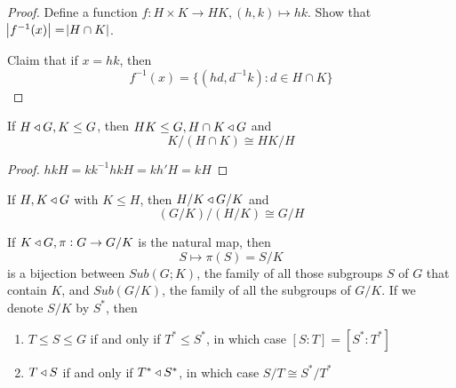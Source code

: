 \documentclass[11pt]{article}
\begin{document}
\begin{proof}
Define a function \(f:H\times K\to HK,(h,k)\mapsto hk\). Show that
\(\abs{f^{-1}(x)}=\abs{H\cap K}\). 

Claim that if \(x=hk\), then
\begin{equation*}
f^{-1}(x)=\{(hd,d^{-1}k):d\in H\cap K\}
\end{equation*}
\end{proof}

\begin{theorem}
If \(H\triangleleft G, K\le G\), then \(HK\le G,H\cap K\triangleleft G\) and
\begin{equation*}
K/(H\cap K)\cong HK/H
\end{equation*}
\end{theorem}

\begin{proof}
\(hkH=kk^{-1}hkH=kh'H=kH\)
\end{proof}

\begin{theorem}
If \(H,K\triangleleft G\) with \(K\le H\), then \(H/K\triangleleft G/K\) and
\begin{equation*}
(G/K)/(H/K)\cong G/H
\end{equation*}
\end{theorem}

\begin{theorem}
If \(K\triangleleft G, \pi:G\to G/K\) is the natural map, then
\begin{equation*}
S\mapsto \pi(S)=S/K
\end{equation*}
is a bijection between \(Sub(G;K)\), the family of all those subgroups \(S\) of
\(G\) that contain \(K\), and \(Sub(G/K)\), the family of all the subgroups of
\(G/K\). If we denote \(S/K\) by \(S^*\), then
\begin{enumerate}
\item \(T\le S\le G\) if and only if \(T^*\le S^*\), in which case \([S:T]=[S^*:T^*]\)
\item \(T\triangleleft S\) if and only if \(T^*\triangleleft S^*\), in which case \(S/T\cong S^*/T^*\)
\end{enumerate}
\end{theorem}

\begin{center}
\end{center}
\end{document}
